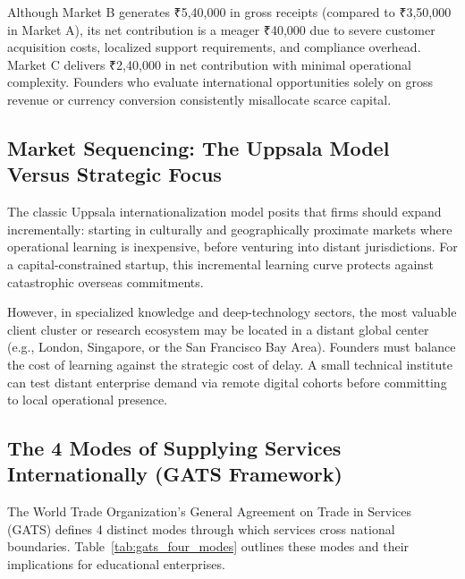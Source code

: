 Although Market B generates ₹5,40,000 in gross receipts (compared to ₹3,50,000 in Market A), its net contribution is a meager ₹40,000 due to severe customer acquisition costs, localized support requirements, and compliance overhead. Market C delivers ₹2,40,000 in net contribution with minimal operational complexity. Founders who evaluate international opportunities solely on gross revenue or currency conversion consistently misallocate scarce capital.

\subsection{Market Sequencing: The Uppsala Model Versus Strategic Focus}
\label{sec:market_sequencing_uppsala_model}

The classic Uppsala internationalization model posits that firms should expand incrementally: starting in culturally and geographically proximate markets where operational learning is inexpensive, before venturing into distant jurisdictions. For a capital-constrained startup, this incremental learning curve protects against catastrophic overseas commitments.

However, in specialized knowledge and deep-technology sectors, the most valuable client cluster or research ecosystem may be located in a distant global center (e.g., London, Singapore, or the San Francisco Bay Area). Founders must balance the cost of learning against the strategic cost of delay. A small technical institute can test distant enterprise demand via remote digital cohorts before committing to local operational presence.

\subsection{The 4 Modes of Supplying Services Internationally (GATS Framework)}
\label{sec:gats_four_modes_services}

The World Trade Organization's General Agreement on Trade in Services (GATS) defines 4 distinct modes through which services cross national boundaries. Table~\ref{tab:gats_four_modes} outlines these modes and their implications for educational enterprises.

